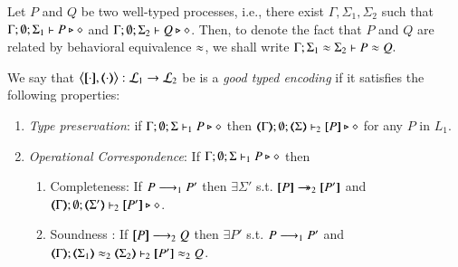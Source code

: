\begin{notation}
	Let $P$ and $Q$ be two well-typed processes, i.e., 
	there exist $\Gamma, \Sigma_1, \Sigma_2$ such that 
	$\Gamma; \emptyset; \Sigma_1 \vdash P \triangleright \diamond$ 
	and
	$\Gamma; \emptyset; \Sigma_2 \vdash Q \triangleright \diamond$.
	Then, to denote the fact that 
	$P$ and $Q$ are related by behavioral equivalence $\approx$, we shall write
	$
		\Gamma; \Sigma_1 \approx \Sigma_2 \vdash P \approx Q.
	$
\end{notation}

\begin{definition}
	\label{def:ep}
	We say that $\enc{\cdot}{\cdot} : \tyl{L}_1 \to \tyl{L}_2$ be is a \emph{good  typed encoding} if it satisfies the following properties:
	
	\begin{enumerate}[1.]
		\item \emph{Type preservation}:	%
		if
			$\Gamma; \emptyset; \Sigma \vdash_1 P \triangleright \diamond$ then $\mapt{\Gamma}; \emptyset; \mapt{\Sigma} \proves_2 \map{P} \hastype \Proc$ for any   $P$ in $L_1$.

		\item \emph{Operational Correspondence}: If $\Gamma; \emptyset; \Sigma \vdash_1 P \triangleright \diamond$ then
		\begin{enumerate}[-]
			\item	Completeness: If $P \longrightarrow_1 P'$ then $\exists \Sigma'$ s.t.
				$\map{P} \Red_2 \map{P'}$ and
				$\mapt{\Gamma}; \emptyset; \mapt{\Sigma'} \proves_2 \map{P'} \hastype \Proc$.
			\item Soundness : If $[\!\![P]\!\!] \longrightarrow_2 Q$ then
				$\exists P'$ s.t. $P \longrightarrow_1 P'$ and \\
				$\mapt{\Gamma}; \mapt{\Sigma_1} \wb_2 \mapt{\Sigma_2} \proves_2 \map{P'} \wb_2 Q$.
		\end{enumerate}
		

\end{enumerate}
\end{definition}
